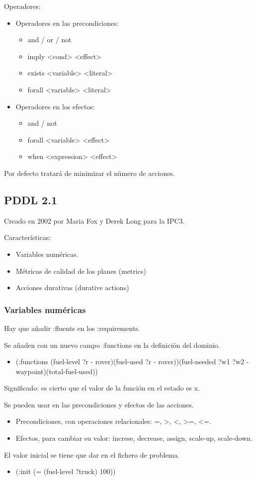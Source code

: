 \documentclass[12pt, twoside, openright]{report} %
\begin{document}
Operadores:
\begin{itemize}
	\item Operadores en las precondiciones:
	\begin{itemize}
		\item and / or / not
		\item imply <cond> <effect>
		\item exists <variable> <literal>
		\item forall <variable> <literal>
	\end{itemize}
	\item Operadores en los efectos:
	\begin{itemize}
		\item and / not
		\item forall <variable> <effect>
		\item when <expression> <effect>
	\end{itemize}
\end{itemize}
Por defecto tratará de minimizar el número de acciones.

\subsection{PDDL 2.1}
Creado en 2002 por Maria Fox y  Derek Long para la IPC3.

Características:
\begin{itemize}
	\item Variables numéricas.
	\item Métricas de calidad de los planes (metrics)
	\item Acciones durativas (durative actions)
\end{itemize}

\subsubsection{Variables numéricas}	
Hay  que añadir :fluents en los :requirements.

Se añaden con un nuevo campo :functions en la definición del dominio. 
\begin{itemize}
	\item (:functions (fuel-level ?r - rover)(fuel-used ?r - rover))(fuel-needed ?w1 ?w2 - waypoint)(total-fuel-used))
\end{itemize}

Significado: es cierto que el valor de la función en el estado es x.

Se pueden usar en las precondiciones y efectos de las acciones.
\begin{itemize}
	\item Precondiciones, con operaciones relacionales: =, >, <, >=, <=.
	\item Efectos, para cambiar su valor: increse, decrease, assign, scale-up, scale-down.
\end{itemize}
El valor inicial se tiene que dar en el fichero de problema.
\begin{itemize}
	\item (:init (= (fuel-level ?truck) 100))
\end{itemize}
\end{document}
